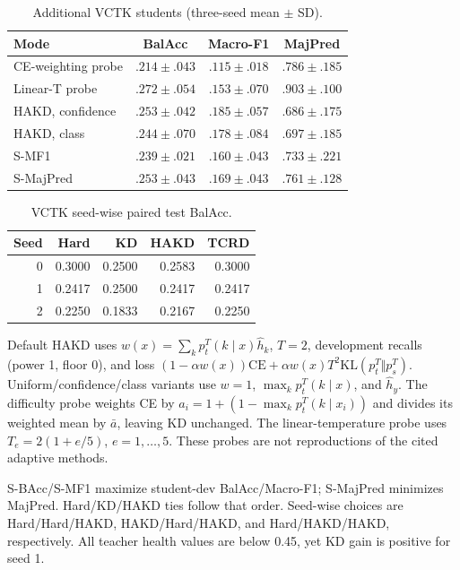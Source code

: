 \documentclass[journal]{IEEEtran}
\begin{document}
\begin{table}[t]
\centering\scriptsize\setlength{\tabcolsep}{3pt}
\caption{Additional VCTK students (three-seed mean $\pm$ SD).}
\label{tab:fullmodes}
\begin{tabular}{lccc}\toprule
Mode & BalAcc & Macro-F1 & MajPred\\\midrule
CE-weighting probe & $.214\pm.043$ & $.115\pm.018$ & $.786\pm.185$\\
Linear-T probe & $.272\pm.054$ & $.153\pm.070$ & $.903\pm.100$\\
HAKD, confidence & $.253\pm.042$ & $.185\pm.057$ & $.686\pm.175$\\
HAKD, class & $.244\pm.070$ & $.178\pm.084$ & $.697\pm.185$\\
S-MF1 & $.239\pm.021$ & $.160\pm.043$ & $.733\pm.221$\\
S-MajPred & $.253\pm.043$ & $.169\pm.043$ & $.761\pm.128$\\\bottomrule
\end{tabular}
\end{table}

\begin{table}[t]
\centering\footnotesize\setlength{\tabcolsep}{7pt}
\caption{VCTK seed-wise paired test BalAcc.}
\label{tab:paired}
\begin{tabular}{rrrrr}\toprule
Seed & Hard & KD & HAKD & TCRD\\\midrule
0&0.3000&0.2500&0.2583&0.3000\\
1&0.2417&0.2500&0.2417&0.2417\\
2&0.2250&0.1833&0.2167&0.2250\\\bottomrule
\end{tabular}
\end{table}
Default HAKD uses $w(x)=\sum_kp_t^T(k\mid x)\widehat h_k$, $T=2$, development recalls (power 1, floor 0), and loss $(1-\alpha w(x))\mathrm{CE}+\alpha w(x)T^2\mathrm{KL}(p_t^T\Vert p_s^T)$. Uniform/confidence/class variants use $w=1$, $\max_kp_t^T(k\mid x)$, and $\widehat h_y$. The difficulty probe weights CE by $a_i=1+(1-\max_kp_t^T(k\mid x_i))$ and divides its weighted mean by $\bar a$, leaving KD unchanged. The linear-temperature probe uses $T_e=2(1+e/5)$, $e=1,\ldots,5$. These probes are not reproductions of the cited adaptive methods.

S-BAcc/S-MF1 maximize student-dev BalAcc/Macro-F1; S-MajPred minimizes MajPred. Hard/KD/HAKD ties follow that order. Seed-wise choices are Hard/Hard/HAKD, HAKD/Hard/HAKD, and Hard/HAKD/HAKD, respectively. All teacher health values are below 0.45, yet KD gain is positive for seed 1.
\end{document}
